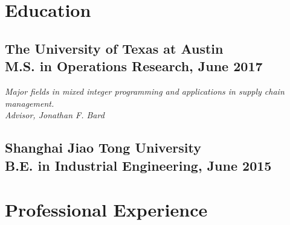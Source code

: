 \documentclass[10pt, letter]{article}
\title{}
\begin{document}
\maketitle


\section{Education}
\subsection{The University of Texas at Austin \\
  \bullet \quad M.S. in Operations Research, June 2017}
\textit{Major fields in mixed integer programming and applications in
supply chain management.} \\
\textit{Advisor, Jonathan F. Bard} \\
\subsection{Shanghai Jiao Tong University \\
  \bullet \quad B.E. in Industrial Engineering, June 2015}

\section{Professional Experience}
\end{document}
